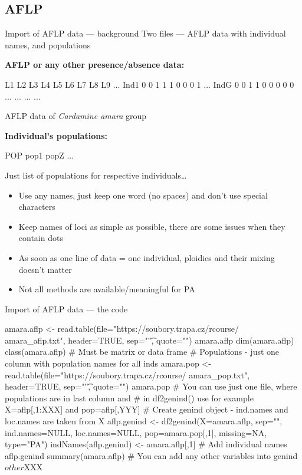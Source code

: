 \documentclass[compress, ucs, xelatex, 11pt, xcolor=svgnames,
  hyperref={
    bookmarks=true,
    unicode=true,
    colorlinks=true,
    pdftitle={Molecular data in R},
    plainpages=false,
    pdfauthor={Vojtech Zeisek},
    pdfsubject={Course about phylogeny and evolution in R},
    pdfcreator={XeLaTeX},
    pdfkeywords={R, evolution, phylogeny, molecular data},
    linkcolor=Tomato,
    anchorcolor=SaddleBrown,
    citecolor=Goldenrod,
    filecolor=DarkMagenta,
    menucolor=Sienna,
    urlcolor=DarkTurquoise,
    pdftex},
  url={hyphens, lowtilde} %
  ]{beamer}
\begin{document}
\subsection{AFLP}

\begin{frame}[fragile]{Import of AFLP data --- background}
  Two files --- AFLP data with individual names, and populations
  \vfill
  \begin{multicols}{2}
  \vfill
  \textbf{AFLP or any other presence/absence data:}
  \vfill
  \begin{spluscode}
        L1 L2 L3 L4 L5 L6 L7 L8 L9 ...
    Ind1 0 0 1 1 1 0 0 0 1 ...
    IndG 0 0 1 1 0 0 0 0 0 ...
     ...  ...              ...
  \end{spluscode}
  \vfill
  \begin{footnotesize}
    AFLP data of \textit{Cardamine amara} group
  \end{footnotesize}
  \vfill
  \textbf{Individual's populations:}
  \vfill
  \begin{spluscode}
    POP
    pop1
    popZ
    ...
  \end{spluscode}
  \vfill
  \begin{footnotesize}
    Just list of populations for respective individuals\ldots
  \end{footnotesize}
  \columnbreak
  \begin{itemize}
    \item Use any names, just keep one word (no spaces) and don't use special characters
    \item Keep names of loci as simple as possible, there are some issues when they contain dots
    \item As soon as one line of data = one individual, ploidies and their mixing doesn't matter
    \item Not all methods are available/meaningful for PA
  \end{itemize}
  \end{multicols}
\end{frame}

\begin{frame}[fragile]{Import of AFLP data --- the code}
  \begin{spluscode}
    amara.aflp <- read.table(file="https://soubory.trapa.cz/rcourse/
      amara_aflp.txt", header=TRUE, sep="\t", quote="")
    amara.aflp
    dim(amara.aflp)
    class(amara.aflp) # Must be matrix or data frame
    # Populations - just one column with population names for all inds
    amara.pop <- read.table(file="https://soubory.trapa.cz/rcourse/
      amara_pop.txt", header=TRUE, sep="\t", quote="")
    amara.pop
    # You can use just one file, where populations are in last column and
    # in df2genind() use for example X=aflp[,1:XXX] and pop=aflp[,YYY]
    # Create genind object - ind.names and loc.names are taken from X
    aflp.genind <- df2genind(X=amara.aflp, sep="", ind.names=NULL,
      loc.names=NULL, pop=amara.pop[,1], missing=NA, type="PA")
    indNames(aflp.genind) <- amara.aflp[,1] # Add individual names
    aflp.genind
    summary(amara.aflp)
    # You can add any other variables into genind$other$XXX
  \end{spluscode}
\end{frame}
\end{document}
